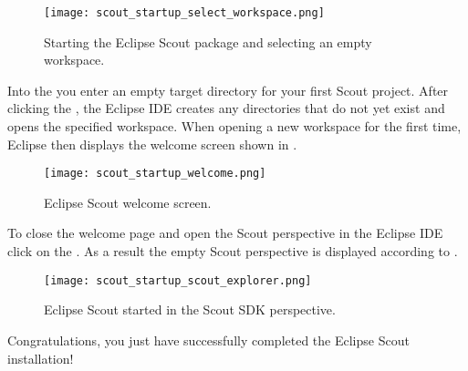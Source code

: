 \begin{figure}
\texttt{[image: scout\_startup\_select\_workspace.png]}
\caption{Starting the Eclipse Scout package and selecting an empty workspace.}
\end{figure}

Into the  you enter an empty target directory for your first Scout project. 
After clicking the , the Eclipse IDE creates any directories that do not yet exist and opens the specified workspace. 
When opening a new workspace for the first time, Eclipse then displays the welcome screen shown in . 

\begin{figure}
\texttt{[image: scout\_startup\_welcome.png]}
\caption{Eclipse Scout welcome screen.}
\end{figure}

To close the welcome page and open the Scout perspective in the Eclipse IDE click on the . 
As a result the empty Scout perspective is displayed according to . 

\begin{figure}
\texttt{[image: scout\_startup\_scout\_explorer.png]}
\caption{Eclipse Scout started in the Scout SDK perspective. }
\end{figure}

Congratulations, you just have successfully completed the Eclipse Scout installation!


